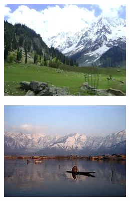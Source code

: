 \begin{figure}[th]
\begin{subfigure}{0.32\columnwidth}
    \end{subfigure}
	\centering
    \begin{subfigure}{0.32\columnwidth}
        \centering
        \includegraphics[width=\columnwidth]{kashmir1.jpg}
    \end{subfigure}
    \begin{subfigure}{0.32\columnwidth}
        \centering
        \includegraphics[width=\columnwidth]{kashmir2.jpg}
    \end{subfigure}
	\begin{subfigure}{0.32\columnwidth}
        \centering

\end{subfigure}
\end{figure}
